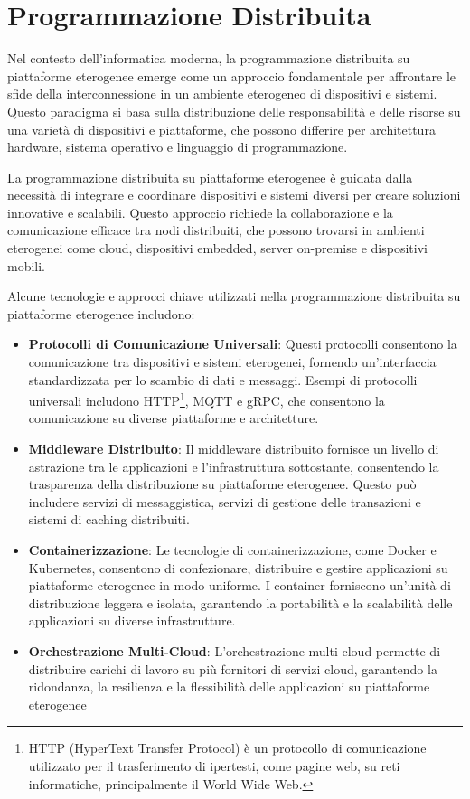 \documentclass[12pt,a4paper,openright,twoside]{book}
\begin{document}
\section{Programmazione Distribuita}

Nel contesto dell'informatica moderna, la programmazione distribuita su piattaforme eterogenee emerge come un approccio fondamentale per affrontare le sfide
 della interconnessione in un ambiente eterogeneo di dispositivi e sistemi. Questo paradigma si basa sulla distribuzione delle responsabilità e delle risorse
 su una varietà di dispositivi e piattaforme, che possono differire per architettura hardware, sistema operativo e linguaggio di programmazione.

La programmazione distribuita su piattaforme eterogenee è guidata dalla necessità di integrare e coordinare dispositivi e sistemi diversi per creare soluzioni
 innovative e scalabili. Questo approccio richiede la collaborazione e la comunicazione efficace tra nodi distribuiti, che possono trovarsi in ambienti eterogenei
 come cloud, dispositivi embedded, server on-premise e dispositivi mobili.

Alcune tecnologie e approcci chiave utilizzati nella programmazione distribuita su piattaforme eterogenee includono:

\begin{itemize}
\item \textbf{Protocolli di Comunicazione Universali}: Questi protocolli consentono la comunicazione tra dispositivi e sistemi eterogenei,
 fornendo un'interfaccia standardizzata per lo scambio di dati e messaggi. Esempi di protocolli universali includono HTTP\footnote{
    HTTP (HyperText Transfer Protocol) è un protocollo di comunicazione utilizzato per il trasferimento di ipertesti, 
    come pagine web, su reti informatiche, principalmente il World Wide Web.
 }, \ac{MQTT} e gRPC, che consentono la comunicazione su diverse piattaforme e architetture.
\item \textbf{Middleware Distribuito}: Il middleware distribuito fornisce un livello di astrazione tra le applicazioni e l'infrastruttura sottostante,
 consentendo la trasparenza della distribuzione su piattaforme eterogenee. Questo può includere servizi di messaggistica, servizi di gestione delle transazioni
  e sistemi di caching distribuiti.
\item \textbf{Containerizzazione}: Le tecnologie di containerizzazione, come Docker e Kubernetes, consentono di confezionare,
 distribuire e gestire applicazioni su piattaforme eterogenee in modo uniforme. I container forniscono un'unità di distribuzione leggera e isolata,
  garantendo la portabilità e la scalabilità delle applicazioni su diverse infrastrutture.
\item \textbf{Orchestrazione Multi-Cloud}: L'orchestrazione multi-cloud permette di distribuire carichi di lavoro su più fornitori di servizi cloud,
 garantendo la ridondanza, la resilienza e la flessibilità delle applicazioni su piattaforme eterogenee
\end{itemize}
\end{document}
